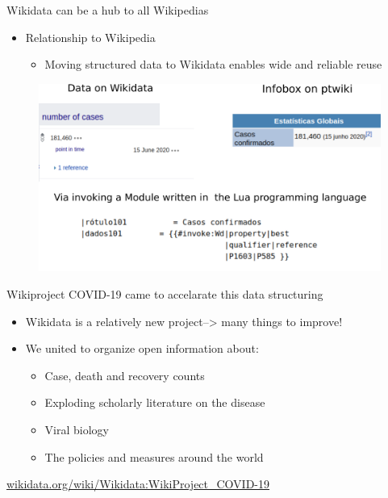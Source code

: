 \documentclass{beamer}
\begin{document}
\begin{frame}{Wikidata can be a hub to all Wikipedias}

\begin{itemize}
    \item Relationship to Wikipedia
    
    \begin{itemize}
        \item Moving structured data to Wikidata enables wide and reliable reuse
    \end{itemize}
\end{itemize}
\begin{figure}
\includegraphics[scale=0.65]{fig/infobox_wikidata_on_pt_wiki.png}
\end{figure}

\end{frame}


\begin{frame}{Wikiproject COVID-19 came to accelarate this data structuring }

\begin{itemize}
    \item Wikidata is a relatively new project--> many things to improve!
    \item We united to organize open information about:
    
    \begin{itemize}
        \item Case, death and recovery counts
        \item Exploding scholarly literature on the disease
        \item Viral biology
        \item The policies and measures around the world
    \end{itemize}
\end{itemize}
\vskip 2cm

\url{wikidata.org/wiki/Wikidata:WikiProject_COVID-19}

\end{frame}
\end{document}
